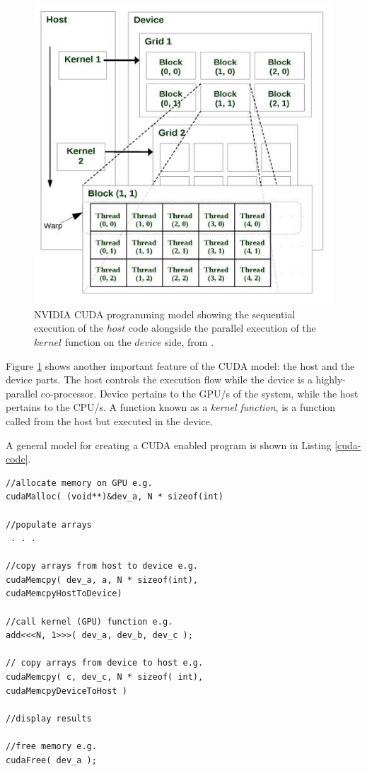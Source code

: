 \documentclass{svmultm}
\begin{document}
	\begin{figure}
		\centering
		\includegraphics[scale=.6]{figures/cuda-model.jpeg} 
		\caption{NVIDIA CUDA programming model showing the sequential execution of the $host$ code alongside the parallel execution of the $kernel$ function on the $device$ side, from \cite{sat}.}
		\label{cuda_model}
	\end{figure}

Figure \ref{cuda_model} shows another important feature of the CUDA model:
the host and the device parts. {The host controls the execution flow while the device
is a highly-parallel co-processor.}
Device pertains to the  {GPU}/s of the system, while the host
pertains to the CPU/s. A function known as a \textit{kernel
function}, is a function called from the host but executed in
the device.

A general model for creating a CUDA enabled program is
shown in Listing \ref{cuda-code}.


\lstset{numbers=left, numberstyle=\tiny, stepnumber=1, numbersep=5pt, label=cuda_gencode}

\pagebreak

\begin{lstlisting}[label=cuda-code,caption=General code flow for CUDA programming written in the CUDA extended C language]
//allocate memory on GPU e.g.
cudaMalloc( (void**)&dev_a, N * sizeof(int)

//populate arrays
 . . .

//copy arrays from host to device e.g.
cudaMemcpy( dev_a, a, N * sizeof(int), 
cudaMemcpyHostToDevice)

//call kernel (GPU) function e.g.
add<<<N, 1>>>( dev_a, dev_b, dev_c );

// copy arrays from device to host e.g.
cudaMemcpy( c, dev_c, N * sizeof( int), 
cudaMemcpyDeviceToHost )

//display results

//free memory e.g.
cudaFree( dev_a );
\end{lstlisting}
\end{document}
